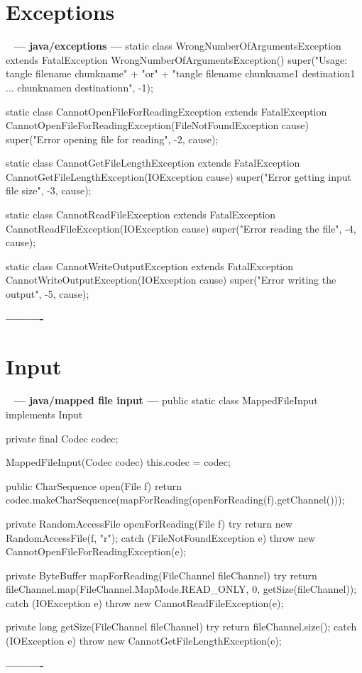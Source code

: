 \documentclass{book}
\newenvironment{chunk}[1]{%
{\ }\newline\noindent%
\hbox{\hskip 2.0cm}{\bf --- #1 ---}%
\verbatim}%                               say exactly what we see
{\endverbatim%
\par{}%
\noindent{}%
\hbox{\hskip 2.0cm}{\bf ----------}%
\par%
\normalsize\noindent}%
\begin{document}
\section{Exceptions}
\begin{chunk}{java/exceptions}
static class WrongNumberOfArgumentsException extends FatalException {
    WrongNumberOfArgumentsException() {
        super("Usage: tangle filename chunkname\n" +
                "or\n" +
                "tangle filename chunkname1 destination1 ... chunknamen destinationn",
              -1);
    }
}

static class CannotOpenFileForReadingException extends FatalException {
    CannotOpenFileForReadingException(FileNotFoundException cause) {
        super("Error opening file for reading", -2, cause);
    }
}

static class CannotGetFileLengthException extends FatalException {
    CannotGetFileLengthException(IOException cause) {
        super("Error getting input file size", -3, cause);
    }
}

static class CannotReadFileException extends FatalException {
    CannotReadFileException(IOException cause) {
        super("Error reading the file", -4, cause);
    }
}

static class CannotWriteOutputException extends FatalException {
    CannotWriteOutputException(IOException cause) {
        super("Error writing the output", -5, cause);
    }
}
\end{chunk}

\section{Input}
\begin{chunk}{java/mapped file input}
public static class MappedFileInput implements Input {
    private final Codec codec;

    MappedFileInput(Codec codec) {
        this.codec = codec;
    }

    public CharSequence open(File f) {
        return codec.makeCharSequence(mapForReading(openForReading(f).getChannel()));
    }

    private RandomAccessFile openForReading(File f) {
        try {
            return new RandomAccessFile(f, "r");
        } catch (FileNotFoundException e) {
            throw new CannotOpenFileForReadingException(e);
        }
    }

    private ByteBuffer mapForReading(FileChannel fileChannel) {
        try {
            return fileChannel.map(FileChannel.MapMode.READ_ONLY, 0, getSize(fileChannel));
        } catch (IOException e) {
            throw new CannotReadFileException(e);
        }
    }

    private long getSize(FileChannel fileChannel) {
        try {
            return fileChannel.size();
        } catch (IOException e) {
            throw new CannotGetFileLengthException(e);
        }
    }
}
\end{chunk}
\end{document}
